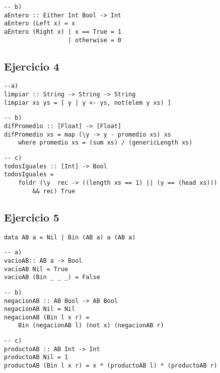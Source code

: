 \documentclass[10pt,a4paper]{article}
\begin{document}
\begin{centrado}
\begin{verbatim}
-- b)
aEntero :: Either Int Bool -> Int
aEntero (Left x) = x
aEntero (Right x) | x == True = 1
                  | otherwise = 0
\end{verbatim}
\end{centrado}

\subsection{Ejercicio 4}
\begin{centrado}
\begin{verbatim}
--a)
limpiar :: String -> String -> String
limpiar xs ys = [ y | y <- ys, not(elem y xs) ]
\end{verbatim}
\end{centrado}
\begin{centrado}
	\begin{verbatim}
-- b)
difPromedio :: [Float] -> [Float]
difPromedio xs = map (\y -> y - promedio xs) xs 
    where promedio xs = (sum xs) / (genericLength xs)
\end{verbatim}
\end{centrado}
\begin{centrado}
	\begin{verbatim}
-- c)
todosIguales :: [Int] -> Bool
todosIguales = 
	foldr (\y  rec -> ((length xs == 1) || (y == (head xs))) 
		&& rec) True
\end{verbatim}
\end{centrado}

\subsection{Ejercicio 5}
\begin{centrado}
\begin{verbatim}
data AB a = Nil | Bin (AB a) a (AB a)
\end{verbatim}
\end{centrado}
\begin{centrado}
	\begin{verbatim}
-- a)
vacioAB:: AB a -> Bool
vacioAB Nil = True
vacioAB (Bin _ _ _) = False
\end{verbatim}
\end{centrado}
\begin{centrado}
	\begin{verbatim}
-- b)
negacionAB :: AB Bool -> AB Bool
negacionAB Nil = Nil
negacionAB (Bin l x r) = 
	Bin (negacionAB l) (not x) (negacionAB r)
\end{verbatim}
\end{centrado}
\begin{centrado}
	\begin{verbatim}
-- c)
productoAB :: AB Int -> Int
productoAB Nil = 1
productoAB (Bin l x r) = x * (productoAB l) * (productoAB r)
\end{verbatim}
\end{centrado}
\end{document}
